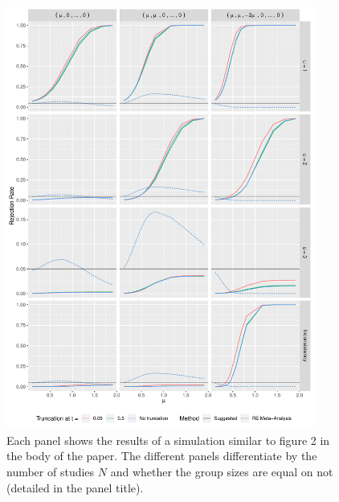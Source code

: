\documentclass[useAMS,usenatbib,referee]{biom}
\theoremstyle{plain}
\begin{document}
	
	\begin{figure}[htpb]
		\centering
		\includegraphics[page = 3, width=0.9\textwidth]{sim2_all.pdf} 
		\caption{ Each panel shows the results of a simulation similar to figure 2 in the body of the paper. The different panels differentiate by the number of studies $N$ and whether the group sizes are equal on not (detailed in the panel title).
		}\label{fig-sim2_extensions2}
	\end{figure}
	
	
	
\end{document}
